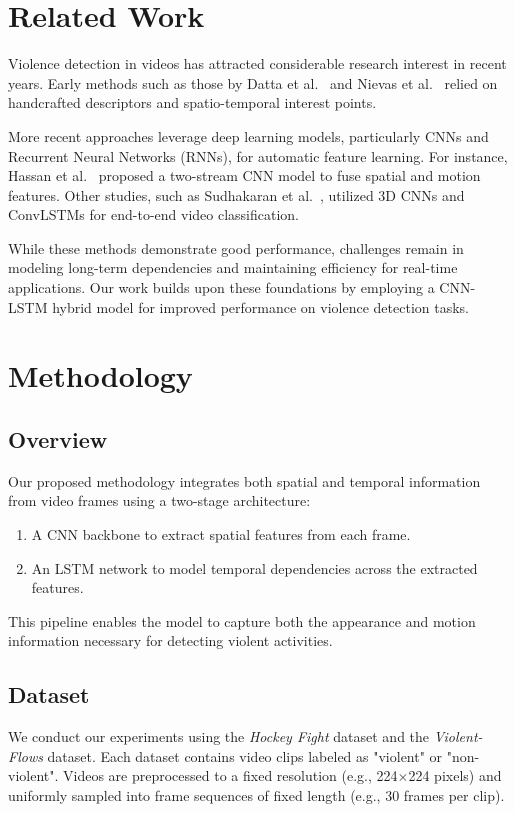 \documentclass[conference]{IEEEtran}
\begin{document}
\section{Related Work}
Violence detection in videos has attracted considerable research interest in recent years. Early methods such as those by Datta et al.~\cite{datta2012} and Nievas et al.~\cite{nievas2011} relied on handcrafted descriptors and spatio-temporal interest points.

More recent approaches leverage deep learning models, particularly CNNs and Recurrent Neural Networks (RNNs), for automatic feature learning. For instance, Hassan et al.~\cite{hassan2017} proposed a two-stream CNN model to fuse spatial and motion features. Other studies, such as Sudhakaran et al.~\cite{sudhakaran2017}, utilized 3D CNNs and ConvLSTMs for end-to-end video classification.

While these methods demonstrate good performance, challenges remain in modeling long-term dependencies and maintaining efficiency for real-time applications. Our work builds upon these foundations by employing a CNN-LSTM hybrid model for improved performance on violence detection tasks.

\section{Methodology}

\subsection{Overview}
Our proposed methodology integrates both spatial and temporal information from video frames using a two-stage architecture:
\begin{enumerate}
    \item A CNN backbone to extract spatial features from each frame.
    \item An LSTM network to model temporal dependencies across the extracted features.
\end{enumerate}

This pipeline enables the model to capture both the appearance and motion information necessary for detecting violent activities.

\subsection{Dataset}
We conduct our experiments using the \textit{Hockey Fight} dataset and the \textit{Violent-Flows} dataset. Each dataset contains video clips labeled as "violent" or "non-violent". Videos are preprocessed to a fixed resolution (e.g., 224$\times$224 pixels) and uniformly sampled into frame sequences of fixed length (e.g., 30 frames per clip).
\end{document}
